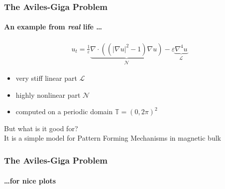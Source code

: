 \documentclass[%
  english,
  hyperref={pdfpagelabels=false},
  aspectratio=1610]{beamer}
\begin{document}
\begin{frame}
  \frametitle{The Aviles-Giga Problem}
  \framesubtitle{An example from \emph{real} life \dots}
  \begin{align*}
    u_t = \frac{1}{\varepsilon} \underbrace{\nabla \cdot \left( \left( \lvert \nabla u \rvert^2 - 1 \right)\nabla u \right)}_{\mathcal{N}} 
    - \varepsilon \underbrace{\nabla^4 u}_{\mathcal{L}}
  \end{align*}
  \pause
  \begin{itemize}
    \item very stiff linear part $\mathcal{L}$
    \item highly nonlinear part $\mathcal{N}$
    \item computed on a periodic domain $\mathbb{T} = \left( 0, 2 \pi \right)^2$
  \end{itemize}
  \vspace{1.5em} 
  \pause
  But what is it good for?\\[1.5em]
  \pause
  It is a simple model for Pattern Forming Mechanisms in magnetic bulk
\end{frame}

\begin{frame}
  \frametitle{The Aviles-Giga Problem}
  \framesubtitle{\dots for nice plots}
  
\end{frame}
\end{document}
